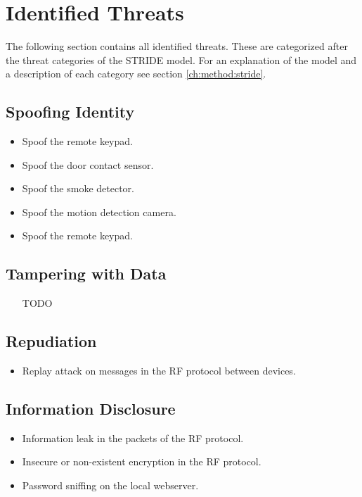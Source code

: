 \section{Identified Threats} \label{ch:threat-model:threats}
The following section contains all identified threats. These are categorized after the threat categories of the STRIDE model. For an explanation of the model and a description of each category see section \ref{ch:method:stride}.

\subsection{Spoofing Identity}
\begin{itemize}
    \item Spoof the remote keypad.
    \item Spoof the door contact sensor.
    \item Spoof the smoke detector.
    \item Spoof the motion detection camera.
    \item Spoof the remote keypad.
\end{itemize}

\subsection{Tampering with Data}
\begin{itemize}
    \item [TODO]
\end{itemize}

\subsection{Repudiation}
\begin{itemize}
    \item Replay attack on messages in the RF protocol between devices.
\end{itemize}

\subsection{Information Disclosure}
\begin{itemize}
    \item Information leak in the packets of the \gls{RF} protocol.
    \item Insecure or non-existent encryption in the \gls{RF} protocol.
    \item Password sniffing on the local webserver.
\end{itemize}

